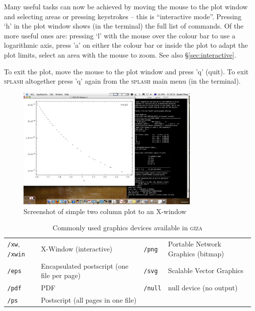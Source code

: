 \documentclass[a4paper,10pt]{article}
\newcommand{\splash}{\textsc{splash }}
\newcommand{\giza}{\textsc{giza }}
\begin{document}
 Many useful tasks can now be achieved by moving the mouse to the plot window and selecting areas or pressing keystrokes -- this is ``interactive mode''. Pressing `h' in the plot window shows (in the terminal) the full list of commands. Of the more useful ones are: pressing `l' with the mouse over the colour bar to use a logarithmic axis, press 'a' on either the colour bar or inside the plot to adapt the plot limits, select an area with the mouse to zoom. See also \S\ref{sec:interactive}.

To exit the plot, move the mouse to the plot window and press 'q' (quit). To exit \splash altogether press 'q' again from the \splash main menu (in the terminal). 
\begin{figure}[ht]
\begin{center}
\includegraphics[width=0.8\textwidth]{rhoh.jpg}
\caption{Screenshot of simple two column plot to an X-window}
\label{fig:rhoh}
\end{center}
\end{figure}

\begin{table}[h]
\centering
\begin{tabular}{|l|l|l|l|}
\hline
\verb+/xw+, \verb+/xwin+ & X-Window (interactive) & \verb+/png+ & Portable Network Graphics (bitmap) \\
\verb+/eps+ & Encapsulated postscript (one file per page) & \verb+/svg+ & Scalable Vector Graphics \\
\verb+/pdf+ & PDF & \verb+/null+ & null device (no output) \\
\verb+/ps+ & Postscript (all pages in one file) & & \\
\hline
\end{tabular}
\caption{Commonly used graphics devices available in \giza}
\label{tab:devices}
\end{table}
\end{document}
